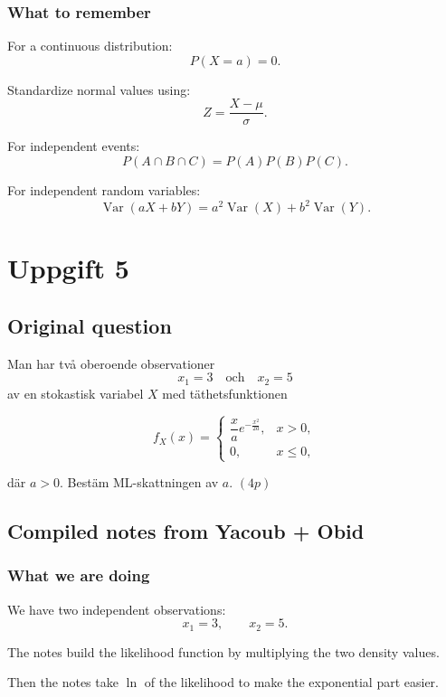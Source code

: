 \documentclass[10pt]{article}
\begin{document}
\subsubsection*{What to remember}

For a continuous distribution:
\[
P(X=a)=0.
\]

Standardize normal values using:
\[
Z=\frac{X-\mu}{\sigma}.
\]

For independent events:
\[
P(A\cap B\cap C)=P(A)P(B)P(C).
\]

For independent random variables:
\[
\operatorname{Var}(aX+bY)
=
a^2\operatorname{Var}(X)
+
b^2\operatorname{Var}(Y).
\]

\section*{Uppgift 5}

\subsection*{Original question}

Man har två oberoende observationer
\[
x_1=3
\quad\text{och}\quad
x_2=5
\]
av en stokastisk variabel \(X\) med täthetsfunktionen

\[
f_X(x)=
\begin{cases}
\dfrac{x}{a}
e^{-\frac{x^2}{2a}},
& x>0,\\
0,
& x\le 0,
\end{cases}
\]

där \(a>0\). Bestäm ML-skattningen av \(a\).
\((4p)\)

\subsection*{Compiled notes from Yacoub + Obid}

\subsubsection*{What we are doing}

We have two independent observations:
\[
x_1=3,
\qquad
x_2=5.
\]

The notes build the likelihood function by
multiplying the two density values.

Then the notes take \(\ln\) of the likelihood to make
the exponential part easier.
\end{document}

